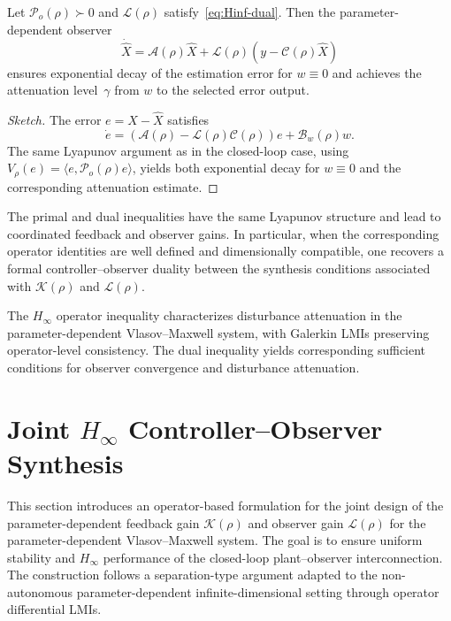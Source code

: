 \documentclass[AMA,Times2COL]{WileyNJDv5}
\begin{document}
\begin{theorem}
\label{thm:dual-Hinf-observer}
Let $\mathcal{P}_o(\rho)\succ0$ and $\mathcal{L}(\rho)$ satisfy~\eqref{eq:Hinf-dual}.
Then the parameter-dependent observer
\[
\dot{\hat X}
=
\mathcal{A}(\rho)\hat X
+
\mathcal{L}(\rho)(y-\mathcal{C}(\rho)\hat X)
\]
ensures exponential decay of the estimation error for $w\equiv0$ and achieves the attenuation level~$\gamma$ from $w$ to the selected error output.
\end{theorem}

\begin{proof}[Sketch]
The error $e=X-\hat X$ satisfies
\[
\dot e=
(\mathcal{A}(\rho)-\mathcal{L}(\rho)\mathcal{C}(\rho))e
+
\mathcal{B}_w(\rho)w .
\]
The same Lyapunov argument as in the closed-loop case, using $V_\rho(e)=\langle e,\mathcal{P}_o(\rho)e\rangle$, yields both exponential decay for $w\equiv0$ and the corresponding attenuation estimate.
\end{proof}

\begin{corollary}
\label{cor:strict-duality}
The primal and dual inequalities have the same Lyapunov structure and lead to coordinated feedback and observer gains. In particular, when the corresponding
operator identities are well defined and dimensionally compatible, one recovers a formal controller--observer duality between the synthesis conditions associated with $\mathcal{K}(\rho)$ and $\mathcal{L}(\rho)$.
\end{corollary}
The $H_\infty$ operator inequality characterizes disturbance attenuation in the parameter-dependent Vlasov--Maxwell system, with Galerkin LMIs preserving operator-level consistency. The dual inequality yields corresponding
sufficient conditions for observer convergence and disturbance attenuation.

\section{Joint \texorpdfstring{$H_\infty$}{H-infinity} Controller--Observer Synthesis}
\label{sec:joint-Hinf}

This section introduces an operator-based formulation for the joint design of the parameter-dependent feedback gain $\mathcal{K}(\rho)$ and observer gain $\mathcal{L}(\rho)$ for the parameter-dependent Vlasov--Maxwell system. The goal is to ensure uniform stability and $H_\infty$ performance of the closed-loop plant--observer interconnection.
The construction follows a separation-type argument adapted to the non-autonomous parameter-dependent infinite-dimensional setting through operator differential LMIs.
\end{document}
